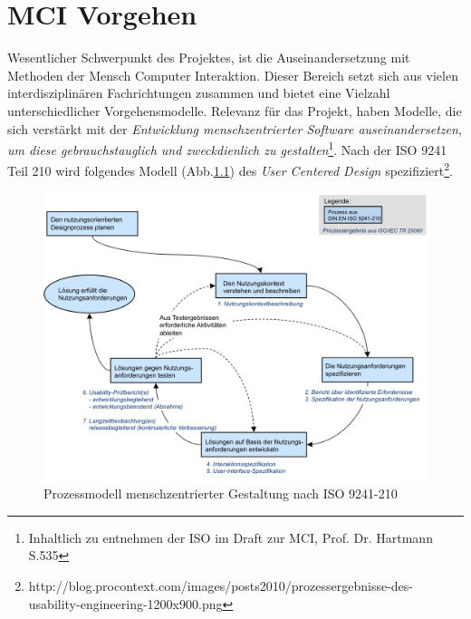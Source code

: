 
\chapter{MCI Vorgehen}
Wesentlicher Schwerpunkt des Projektes, ist die Auseinandersetzung mit Methoden der Mensch Computer Interaktion. Dieser Bereich  setzt sich aus vielen interdisziplinären Fachrichtungen zusammen und bietet eine Vielzahl unterschiedlicher Vorgehensmodelle. 
Relevanz für das Projekt, haben Modelle, die sich verstärkt mit der \textit{Entwicklung menschzentrierter Software auseinandersetzen, um diese gebrauchstauglich und zweckdienlich zu gestalten}\footnote{Inhaltlich zu entnehmen der ISO im Draft zur MCI, Prof. Dr. Hartmann S.535}.
Nach der ISO 9241 Teil 210 wird folgendes Modell (Abb.\ref{prozessmodell}) des \textit{User Centered Design} spezifiziert\footnote{http://blog.procontext.com/images/posts2010/prozessergebnisse-des-usability-engineering-1200x900.png}. 

\begin{figure}[H]
\includegraphics[width=.9\textwidth]{./images/prozessergebnisse.png}
\caption{Prozessmodell menschzentrierter Gestaltung nach ISO 9241-210 }
\label{prozessmodell}
\end{figure}

